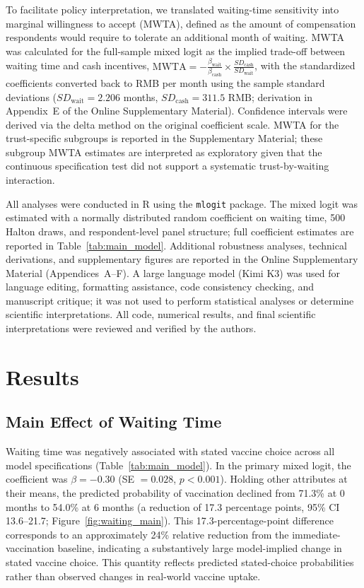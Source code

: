\documentclass[12pt]{article}
\begin{document}
To facilitate policy interpretation, we translated waiting-time sensitivity into marginal willingness to accept (MWTA), defined as the amount of compensation respondents would require to tolerate an additional month of waiting. MWTA was calculated for the full-sample mixed logit as the implied trade-off between waiting time and cash incentives, $\mathrm{MWTA} = -\frac{\beta_{\text{wait}}}{\beta_{\text{cash}}} \times \frac{SD_{\text{cash}}}{SD_{\text{wait}}}$, with the standardized coefficients converted back to RMB per month using the sample standard deviations ($SD_{\text{wait}} = 2.206$ months, $SD_{\text{cash}} = 311.5$ RMB; derivation in Appendix~E of the Online Supplementary Material). Confidence intervals were derived via the delta method on the original coefficient scale. MWTA for the trust-specific subgroups is reported in the Supplementary Material; these subgroup MWTA estimates are interpreted as exploratory given that the continuous specification test did not support a systematic trust-by-waiting interaction.

All analyses were conducted in R using the \texttt{mlogit} package. The mixed logit was estimated with a normally distributed random coefficient on waiting time, 500 Halton draws, and respondent-level panel structure; full coefficient estimates are reported in Table~\ref{tab:main_model}. Additional robustness analyses, technical derivations, and supplementary figures are reported in the Online Supplementary Material (Appendices~A--F). A large language model (Kimi K3) was used for language editing, formatting assistance, code consistency checking, and manuscript critique; it was not used to perform statistical analyses or determine scientific interpretations. All code, numerical results, and final scientific interpretations were reviewed and verified by the authors.

\section{Results}\label{sec:results}
\subsection{Main Effect of Waiting Time}

Waiting time was negatively associated with stated vaccine choice across all model specifications (Table~\ref{tab:main_model}). In the primary mixed logit, the coefficient was $\beta = -0.30$ (SE $= 0.028$, $p < 0.001$). Holding other attributes at their means, the predicted probability of vaccination declined from 71.3\% at 0 months to 54.0\% at 6 months (a reduction of 17.3 percentage points, 95\% CI 13.6–21.7; Figure~\ref{fig:waiting_main}). This 17.3-percentage-point difference corresponds to an approximately 24\% relative reduction from the immediate-vaccination baseline, indicating a substantively large model-implied change in stated vaccine choice. This quantity reflects predicted stated-choice probabilities rather than observed changes in real-world vaccine uptake.
\end{document}

